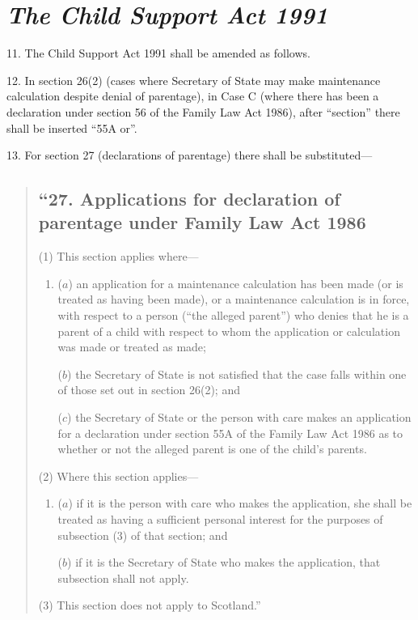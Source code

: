 \documentclass[12pt,a4paper]{article}
\begin{document}
\section*{\itshape The Child Support Act 1991}

11. The Child Support Act 1991 shall be amended as follows.

\medskip

12. In section 26(2)  (cases where Secretary of State may make maintenance calculation despite denial of parentage), in Case C (where there has been a declaration under section 56 of the Family Law Act 1986), after “section” there shall be inserted “55A or”.

\medskip

13. For section 27 (declarations of parentage) there shall be substituted—
\begin{quotation}
\subsection*{“27. Applications for declaration of parentage under Family Law Act 1986}

(1) This section applies where—
\begin{enumerate}\item[]
($a$) an application for a maintenance calculation has been made (or is treated as having been made), or a maintenance calculation is in force, with respect to a person (“the alleged parent”) who denies that he is a parent of a child with respect to whom the application or calculation was made or treated as made;

($b$) the Secretary of State is not satisfied that the case falls within one of those set out in section 26(2); and

($c$) the Secretary of State or the person with care makes an application for a declaration under section 55A of the Family Law Act 1986 as to whether or not the alleged parent is one of the child’s parents.
\end{enumerate}

(2) Where this section applies—
\begin{enumerate}\item[]
($a$) if it is the person with care who makes the application, she shall be treated as having a sufficient personal interest for the purposes of subsection (3)  of that section; and

($b$) if it is the Secretary of State who makes the application, that subsection shall not apply.
\end{enumerate}

(3) This section does not apply to Scotland.”
\end{quotation}
\end{document}
